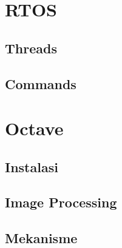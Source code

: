 \documentclass[11pt,fleqn]{book} %
\begin{document}
\chapter{RTOS}
\section{Threads}

\section{Commands}

\newpage
{} %
\chapter{Octave}
\section{Instalasi}
\section{Image Processing}
\section{Mekanisme}
\end{document}
